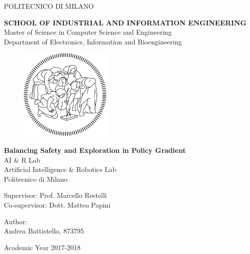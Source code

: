 \thispagestyle{empty}
\vspace*{-1.5cm} \bfseries{
\begin{center}
  \LARGE
  POLITECNICO DI MILANO\\
  \vspace{0.2cm}
  
  \normalsize
  \textbf{{\Large S}CHOOL OF {\Large I}NDUSTRIAL AND {\Large I}NFORMATION {\Large E}NGINEERING} \\
  Master of Science in Computer Science and Engineering\\
  Department of Electronics, Information and Bioengineering\\
  \vspace{1cm}
  \begin{figure}[htbp]
    \begin{center}
      \includegraphics[width=4.5cm]{pictures/newlogo}
    \end{center}
  \end{figure}
  \vspace*{0.3cm} \LARGE



  \textbf{Balancing Safety and Exploration in Policy Gradient}\\



  \vspace*{.75truecm} \large
  AI \& R Lab \\
  Artificial Intelligence \& Robotics Lab\\
   Politecnico di Milano
\end{center}
\vspace*{3.0cm} \large
\begin{flushleft}


  Supervisor: Prof. Marcello Restelli \\
  Co-supervisor: Dott. Matteo Papini 

\end{flushleft}
\vspace*{1.0cm}
\begin{flushright}


  Author:\\ Andrea Battistello, 873795\\ 


\end{flushright}
\vspace*{0.5cm}
\begin{center}



  Academic Year 2017-2018
\end{center} \clearpage
}

